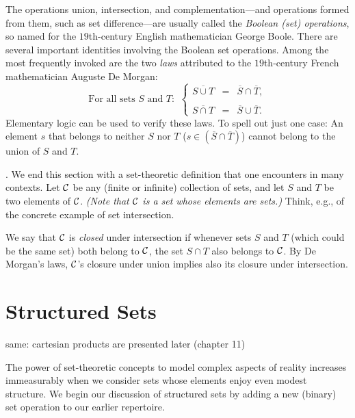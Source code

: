 The operations union, intersection, and complementation---and
operations formed from them, such as set difference---are usually
called the {\em Boolean (set) operations},
 so named for the
$19$th-century English mathematician George Boole.
 There are several important identities involving
the Boolean set operations.  Among the most frequently invoked are the
two {\em laws} attributed to the $19$th-century French mathematician
Auguste De Morgan: 
\begin{equation}
\label{e.de-morgan}
\mbox{For all sets $S$ and $T$: } \ \left\{
\begin{array}{lcl}
\overline{S \cup T} & = & \overline{S} \cap \overline{T}, \\
 \\
\overline{S \cap T} & = & \overline{S} \cup \overline{T}.
\end{array}
\right.
\end{equation}
Elementary logic can be used to verify these laws.  To spell out just
one case: An element $s$ that belongs to neither $S$ nor $T$ ($s \in
\left(\overline{S} \cap \overline{T}\right)$) cannot belong to the
union of $S$ and $T$.

\medskip

.
%
We end this section with a set-theoretic definition that one
encounters in many contexts.  Let $\cal C$ be any (finite or infinite)
collection of sets, and let $S$ and $T$ be two elements of $\cal C$.
{\em (Note that $\cal C$ is a set whose elements are sets.)}  Think,
e.g., of the concrete example of set intersection.

We say that $\cal C$ is {\em closed} under intersection if whenever
sets $S$ and $T$ (which could be the same set) both belong to $\cal
C$, the set $S \cap T$ also belongs to $\cal C$.  By De Morgan's laws,
$\cal C$'s closure under union implies also its closure under
intersection.

\section{Structured Sets}
\label{sec:structured-set}

{\Denis same: cartesian products are presented later (chapter 11)}

The power of set-theoretic concepts to model complex aspects of
reality increases immeasurably when we consider sets whose elements
enjoy even modest structure.  We begin our discussion of structured
sets by adding a new (binary) set operation to our earlier repertoire.

